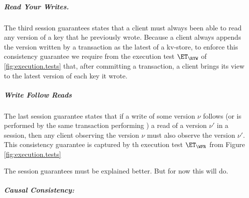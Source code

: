 \subparagraph{Read Your Writes.}
The third session guarantees states that a client must always been able to read any version 
of a key that he previously wrote. Because a client always appends the version written by  
a transaction as the latest of a kv-store, to enforce this consistency guarantee we require from 
the execution test $\ET_{\RYW}$ of \cref{fig:execution.tests} that, after committing a transaction, 
a client brings its view to the latest version of each key it wrote.  

\subparagraph{Write Follow Reads}
The last session guarantee states that if a write of some version $\nu$ follows (or is performed by the same transaction performing ) 
a read of a version $\nu'$ in a session, 
then any client observing the version $\nu$ must also observe the version $\nu'$. This consistency guarantee is 
captured by th execution test $\ET_{\WFR}$ from Figure \cref{fig:execution.tests}

\ac{The session guarantees must be explained better. But for now this will do.}

\subparagraph{Causal Consistency: }